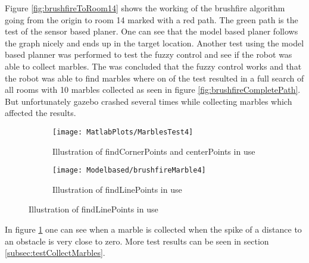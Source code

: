 \documentclass[../Head/Main.tex]{subfiles}
\begin{document}
Figure \ref{fig:brushfireToRoom14} shows the working of the brushfire algorithm going from the origin to room 14 marked with a red path. The green path is the test of the sensor based planer. One can see that the model based planer follows the graph nicely and ends up in the target location. Another test using the model based planner was performed to test the fuzzy control and see if the robot was able to collect marbles. The was concluded that the fuzzy control works and that the robot was able to find marbles where on of the test resulted in a full search of all rooms with 10 marbles collected as seen in figure \ref{fig:brushfireCompletePath}. But unfortunately gazebo crashed several times while collecting marbles which affected the results.
  \begin{figure}[H]
   \begin{subfigure}[b]{0.49\textwidth}
    \centering
    \texttt{[image: MatlabPlots/MarblesTest4]}
    \caption{Illustration of findCornerPoints and centerPoints in use}
    \label{fig:matlabPlotMarbletest14}
  \end{subfigure}
  \hfill
   \begin{subfigure}[b]{0.49\textwidth}
    \centering
    \texttt{[image: Modelbased/brushfireMarble4]}
    \caption{Illustration of findLinePoints in use}
    \label{fig:brushfireMarbleFindingTest}
  \end{subfigure}
  \end{figure}  

In figure \ref{fig:matlabPlotMarbletest14} one can see when a marble is collected when the spike of a distance to an obstacle is very close to zero. More test results can be seen in section \ref{subsec:testCollectMarbles}.
\end{document}
